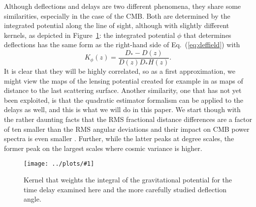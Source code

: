 \documentclass[prl,amsmath,amssymb,floatfix,superscriptaddress,nofootinbib,twocolumn]{revtex4-1}
\def\be{\begin{equation}}
\def\ee{\end{equation}}
\newcommand{\ec}[1]{Eq.~(\ref{eq:#1})}
\newcommand{\sfig}[2]{
\texttt{[image: ../plots/\#1]}
        }
\newcommand{\Sfig}[2]{
   \begin{figure}[thbp]
   \begin{center}
    \sfig{#1.pdf}{\columnwidth}
    \caption{{\small #2}}
    \label{fig:#1}
     \end{center}
   \end{figure}
}
\newcommand{\rf}[1]{\ref{fig:#1}}
\newcommand{\scott}[1]{{\color{darkgreen} #1}}
\newcommand{\wh}[1]{{\color{red} #1}}
\begin{document}
Although deflections and delays are two different phenomena, they share some similarities, especially in the case of the CMB. Both are determined by the integrated potential along the line of sight, although with slightly different kernels, as depicted in Figure~\rf{kernel}: the integrated potential $\phi$ that determines deflections has the same form as the right-hand side of \ec{deffield}  with
\be
K_\phi(z) = \frac{D_*-D(z)}{ D(z) D_* H(z)} .
\ee
It is clear that they will be highly correlated, so as a first approximation, we might view the maps of the lensing potential created for example in \citet{Aghanim:2018oex} as maps of distance to the last scattering surface. Another similarity, one that has not yet been exploited, is that the quadratic estimator formalism  \cite{Hu:2001tn} can be applied to the delays as well, and this is what we will do in this paper.  We start though with the rather daunting facts that the RMS fractional distance differences are a factor of ten smaller than the RMS angular deviations 
 and their impact on CMB power spectra is even smaller \cite{Hu:2001yq}. Further, while the latter peaks at degree scales, the former peak on the largest scales where cosmic variance is
 higher.

\Sfig{kernel}{Kernel that weights the integral of the gravitational potential for the time delay examined here and the more carefully studied deflection angle.}
\end{document}
